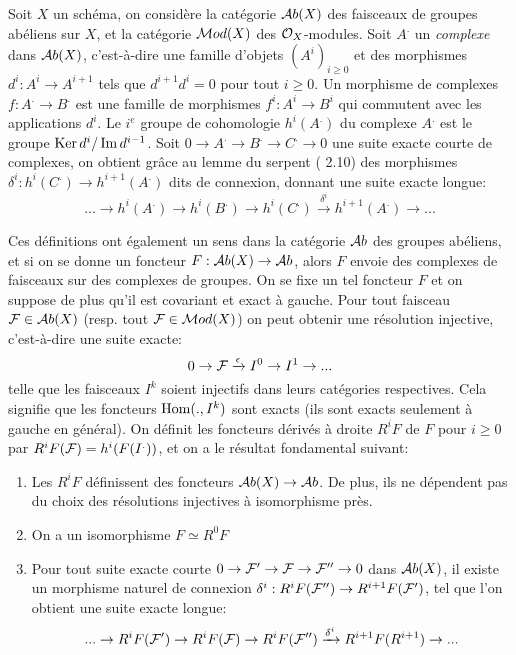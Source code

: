 Soit $X$ un schéma, on considère la catégorie $\mathcal{A} b(X)$ des faisceaux de groupes abéliens sur $X$, et la catégorie $\mathcal{M} od(X)$ des $\mathcal{O}_X$-modules. Soit $A^.$ un \textit{complexe} dans $\mathcal{A} b(X)$, c'est-à-dire une famille d'objets $(A^i)_{i\geq 0}$ et des morphismes $d^i:A^i\rightarrow A^{i+1}$ tels que $d^{i+1}d^i=0$ pour tout $i\geq 0$. Un morphisme de complexes $f:A^.\rightarrow B^.$ est une famille de morphismes $f^i:A^i\rightarrow B^i$ qui commutent avec les applications $d^i$. Le $i^e$ groupe de cohomologie $h^i(A^.)$ du complexe $A^.$ est le groupe $\operatorname{Ker} d^i/\operatorname{Im} d^{i-1}$. Soit $0\rightarrow A^.\rightarrow B^. \rightarrow C^. \rightarrow 0$ une suite exacte courte de complexes, on obtient grâce au lemme du serpent (\cite{atiyahmacdo} 2.10) des morphismes $\delta ^i:h^i(C^.)\rightarrow h^{i+1}(A^.) $ dits de connexion, donnant une suite exacte longue:
\begin{equation}\label{eq:longSES}
...\rightarrow h^i(A^.) \rightarrow h^i(B^.) \rightarrow h^i(C^.) \xrightarrow{\delta ^i} h^{i+1}(A^.) \rightarrow ...
\end{equation}

Ces définitions ont également un sens dans la catégorie $\mathcal{A} b$ des groupes abéliens, et si on se donne un foncteur $F:\mathcal{A} b(X)\rightarrow \mathcal{A} b$, alors $F$ envoie des complexes de faisceaux sur des complexes de groupes. On se fixe un tel foncteur $F$ et on suppose de plus qu'il est covariant et exact à gauche. Pour tout faisceau $\mathcal{F}\in \mathcal{A} b(X)$ (resp. tout $\mathcal{F}\in\mathcal{M} od(X)$) on peut obtenir une résolution injective, c'est-à-dire une suite exacte:
$$0\rightarrow \mathcal{F} \xrightarrow{\epsilon} I^0\rightarrow I^1\rightarrow ...$$
telle que les faisceaux $I^k$ soient injectifs dans leurs catégories respectives. Cela signifie que les foncteurs $\operatorname{Hom}(.,I^k)$ sont exacts (ils sont exacts seulement à gauche en général). On définit les foncteurs dérivés à droite $R^iF$ de $F$ pour $i\geq 0$ par $R^i F(\mathcal{F})=h^i(F(I^.))$, et on a le résultat fondamental suivant:

\begin{thm}
\begin{enumerate}
\item Les $R^i F$ définissent des foncteurs $\mathcal{A} b(X)\rightarrow \mathcal{A} b$. De plus, ils ne dépendent pas du choix des résolutions injectives à isomorphisme près.
\item On a un isomorphisme $F\simeq R^0F$
\item Pour tout suite exacte courte $0\rightarrow \mathcal{F}'\rightarrow \mathcal{F} \rightarrow \mathcal{F}'' \rightarrow 0$ dans $\mathcal{A} b(X)$, il existe un morphisme naturel de connexion $\delta^i:R^iF(\mathcal{F}'')\rightarrow R^{i+1}F(\mathcal{F}')$, tel que l'on obtient une suite exacte longue:
$$...\rightarrow R^iF(\mathcal{F}') \rightarrow R^iF(\mathcal{F}) \rightarrow R^iF(\mathcal{F}'') \xrightarrow{\delta ^i} R^{i+1}F(R^{i+1}) \rightarrow ...$$
\end{enumerate}
\end{thm}

